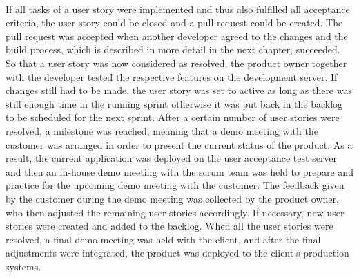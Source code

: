 \documentclass[Bachelor,BIF,english]{twbook}
\begin{document}
\\[\baselineskip]
If all tasks of a user story were implemented and thus also fulfilled all acceptance criteria, the user story could be closed and a pull request could be created. The pull request was accepted when another developer agreed to the changes and the build process, which is described in more detail in the next chapter, succeeded. So that a user story was now considered as resolved, the product owner together with the developer tested the respective features on the development server. If changes still had to be made, the user story was set to active as long as there was still enough time in the running sprint otherwise it was put back in the backlog to be scheduled for the next sprint. After a certain number of user stories were resolved, a milestone was reached, meaning that a demo meeting with the customer was arranged in order to present the current status of the product. As a result, the current application was deployed on the user acceptance test server and then an in-house demo meeting with the scrum team was held to prepare and practice for the upcoming demo meeting with the customer. The feedback given by the customer during the demo meeting was collected by the product owner, who then adjusted the remaining user stories accordingly. If necessary, new user stories were created and added to the backlog. When all the user stories were resolved, a final demo meeting was held with the client, and after the final adjustments were integrated, the product was deployed to the client's production systems.
\end{document}
